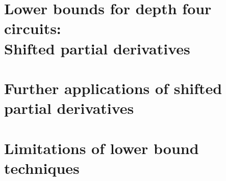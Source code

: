 




\part[Lower bounds for depth four circuits]{Lower bounds for depth four circuits:\\Shifted partial derivatives}





\part{Further applications of shifted partial derivatives}













\part{Limitations of lower bound techniques}








